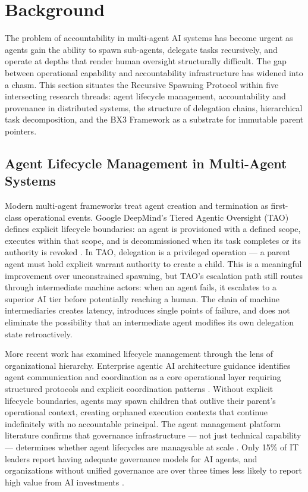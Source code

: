 \section{Background}
\label{sec:background}

The problem of accountability in multi-agent AI systems has become urgent as agents gain the ability to spawn sub-agents, delegate tasks recursively, and operate at depths that render human oversight structurally difficult. The gap between operational capability and accountability infrastructure has widened into a chasm. This section situates the Recursive Spawning Protocol within five intersecting research threads: agent lifecycle management, accountability and provenance in distributed systems, the structure of delegation chains, hierarchical task decomposition, and the BX3 Framework as a substrate for immutable parent pointers.

\subsection{Agent Lifecycle Management in Multi-Agent Systems}
\label{sec:lifecycle-management}

Modern multi-agent frameworks treat agent creation and termination as first-class operational events. Google DeepMind's Tiered Agentic Oversight (TAO) defines explicit lifecycle boundaries: an agent is provisioned with a defined scope, executes within that scope, and is decommissioned when its task completes or its authority is revoked \cite{tao2025}. In TAO, delegation is a privileged operation --- a parent agent must hold explicit warrant authority to create a child. This is a meaningful improvement over unconstrained spawning, but TAO's escalation path still routes through intermediate machine actors: when an agent fails, it escalates to a superior AI tier before potentially reaching a human. The chain of machine intermediaries creates latency, introduces single points of failure, and does not eliminate the possibility that an intermediate agent modifies its own delegation state retroactively.

More recent work has examined lifecycle management through the lens of organizational hierarchy. Enterprise agentic AI architecture guidance identifies agent communication and coordination as a core operational layer requiring structured protocols and explicit coordination patterns \cite{enterprise2025}. Without explicit lifecycle boundaries, agents may spawn children that outlive their parent's operational context, creating orphaned execution contexts that continue indefinitely with no accountable principal. The agent management platform literature confirms that governance infrastructure --- not just technical capability --- determines whether agent lifecycles are manageable at scale \cite{kore2025}. Only 15\% of IT leaders report having adequate governance models for AI agents, and organizations without unified governance are over three times less likely to report high value from AI investments \cite{kore2025}.

